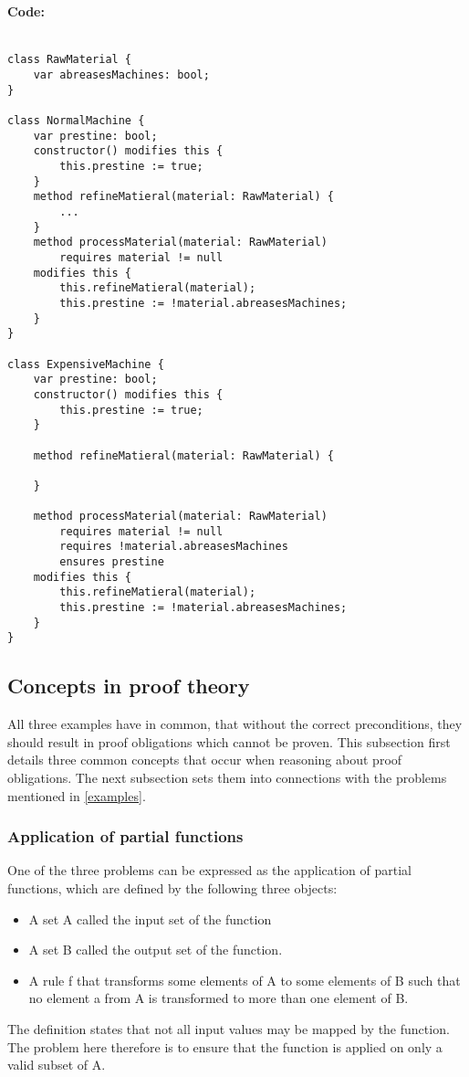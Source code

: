 \paragraph{Code:}
\begin{lstlisting}[language=dafny]

class RawMaterial {
	var abreasesMachines: bool;
}

class NormalMachine {
	var prestine: bool;
	constructor() modifies this {
		this.prestine := true;
	}
	method refineMatieral(material: RawMaterial) {
		...
	}
	method processMaterial(material: RawMaterial) 
		requires material != null
	modifies this {
		this.refineMatieral(material);
		this.prestine := !material.abreasesMachines;
	}
}

class ExpensiveMachine {
	var prestine: bool;
	constructor() modifies this {
		this.prestine := true;
	}
	
	method refineMatieral(material: RawMaterial) {
	
	}
	
	method processMaterial(material: RawMaterial) 
		requires material != null
		requires !material.abreasesMachines
		ensures prestine
	modifies this {
		this.refineMatieral(material);
		this.prestine := !material.abreasesMachines;
	}
}
\end{lstlisting}

\subsection{Concepts in proof theory}
All three examples have in common, that without the correct preconditions, they should result in proof obligations which cannot be proven.
This subsection first details three common concepts that occur when reasoning about proof obligations. The next subsection sets them into connections with the problems mentioned in \ref{examples}.

\subsubsection{Application of partial functions} \label{partial function}
One of the three problems can be expressed as the application of partial functions, which are defined by the following three objects:
\begin{itemize}
	\item A set A called the input set of the function
	\item A set B called the output set of the function.
	\item A rule f that transforms some elements of A to some elements of B such that no element a from A is transformed to more than one element of B.\cite[197]{khoussainov}
\end{itemize}
The definition states that not all input values may be mapped by the function. The problem here therefore is to ensure that the function is applied on only a valid subset of A.


